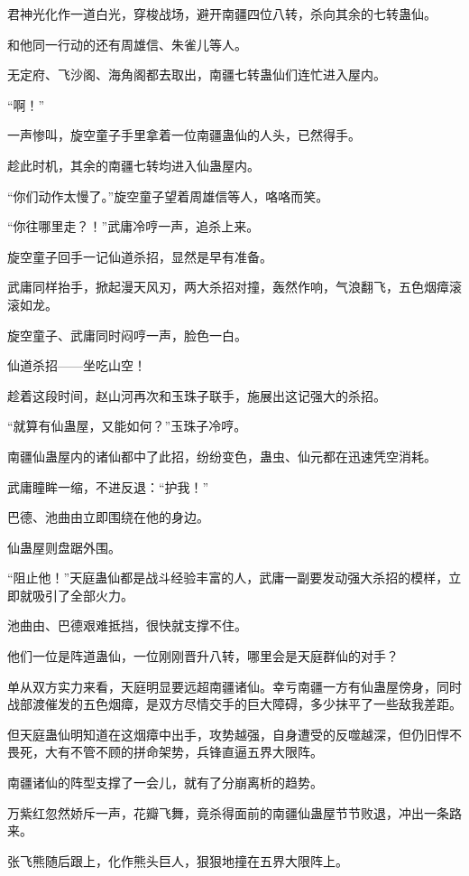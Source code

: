 \begin{this_body}
君神光化作一道白光，穿梭战场，避开南疆四位八转，杀向其余的七转蛊仙。

和他同一行动的还有周雄信、朱雀儿等人。

无定府、飞沙阁、海角阁都去取出，南疆七转蛊仙们连忙进入屋内。

“啊！”

一声惨叫，旋空童子手里拿着一位南疆蛊仙的人头，已然得手。

趁此时机，其余的南疆七转均进入仙蛊屋内。

“你们动作太慢了。”旋空童子望着周雄信等人，咯咯而笑。

“你往哪里走？！”武庸冷哼一声，追杀上来。

旋空童子回手一记仙道杀招，显然是早有准备。

武庸同样抬手，掀起漫天风刃，两大杀招对撞，轰然作响，气浪翻飞，五色烟瘴滚滚如龙。

旋空童子、武庸同时闷哼一声，脸色一白。

仙道杀招——坐吃山空！

趁着这段时间，赵山河再次和玉珠子联手，施展出这记强大的杀招。

“就算有仙蛊屋，又能如何？”玉珠子冷哼。

南疆仙蛊屋内的诸仙都中了此招，纷纷变色，蛊虫、仙元都在迅速凭空消耗。

武庸瞳眸一缩，不进反退：“护我！”

巴德、池曲由立即围绕在他的身边。

仙蛊屋则盘踞外围。

“阻止他！”天庭蛊仙都是战斗经验丰富的人，武庸一副要发动强大杀招的模样，立即就吸引了全部火力。

池曲由、巴德艰难抵挡，很快就支撑不住。

他们一位是阵道蛊仙，一位刚刚晋升八转，哪里会是天庭群仙的对手？

单从双方实力来看，天庭明显要远超南疆诸仙。幸亏南疆一方有仙蛊屋傍身，同时战部渡催发的五色烟瘴，是双方尽情交手的巨大障碍，多少抹平了一些敌我差距。

但天庭蛊仙明知道在这烟瘴中出手，攻势越强，自身遭受的反噬越深，但仍旧悍不畏死，大有不管不顾的拼命架势，兵锋直逼五界大限阵。

南疆诸仙的阵型支撑了一会儿，就有了分崩离析的趋势。

万紫红忽然娇斥一声，花瓣飞舞，竟杀得面前的南疆仙蛊屋节节败退，冲出一条路来。

张飞熊随后跟上，化作熊头巨人，狠狠地撞在五界大限阵上。


\end{this_body}
